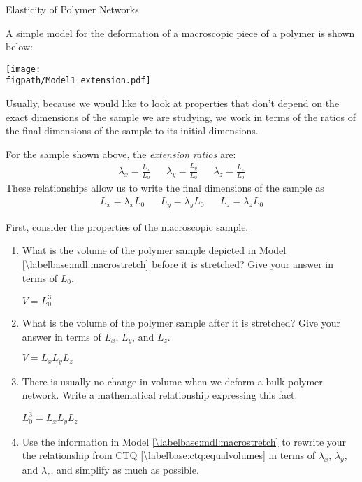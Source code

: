 \begin{activity}{Elasticity of Polymer Networks}
\begin{model}
	A simple model for the deformation of a macroscopic piece of a polymer is shown below:
	
	\vspace{6pt}
	\centerline{\texttt{[image: \\figpath/Model1\_extension.pdf]}}
	
	Usually, because we would like to look at properties that don't depend on the exact dimensions of the sample we are studying, we work in terms of the ratios of the final dimensions of the sample to its initial dimensions.
	
	For the sample shown above, the \emph{extension ratios} are:
	\begin{align*}
		\lambda_x = \frac{L_x}{L_0} && \lambda_y = \frac{L_y}{L_0} && \lambda_z = \frac{L_z}{L_0}
	\end{align*}
	These relationships allow us to write the final dimensions of the sample as
	\begin{align*}
		L_x = \lambda_x L_0 && L_y = \lambda_y L_0 && L_z = \lambda_z L_0
	\end{align*}
	
\end{model}


\begin{ctqs}

	\question First, consider the properties of the macroscopic sample.
	
		\begin{enumerate}
		
			\item What is the volume of the polymer sample depicted in Model \ref{\labelbase:mdl:macrostretch} before it is stretched?  Give your answer in terms of $L_0$.
	
		\begin{solution}[0.75in]
		
			$V = L_0^3$
		\end{solution}
	
			\item What is the volume of the polymer sample after it is stretched? Give your answer in terms of $L_x$, $L_y$, and $L_z$.
	
		\begin{solution}[0.75in]
		
			$V = L_x L_y L_z$
		\end{solution}
	
			\item There is usually no change in volume when we deform a bulk polymer network.  Write a mathematical relationship expressing this fact.
		\label{\labelbase:ctq:equalvolumes}
		\begin{solution}[0.75in]
			$L_0^3 = L_x L_y L_z$
		\end{solution}
			\item Use the information in Model \ref{\labelbase:mdl:macrostretch} to rewrite your the relationship from CTQ \ref{\labelbase:ctq:equalvolumes} in terms of $\lambda_x$, $\lambda_y$, and $\lambda_z$, and simplify as much as possible. \label{\labelbase:ctq:equalvolumes2}
	

\end{enumerate}
\end{ctqs}
\end{activity}
